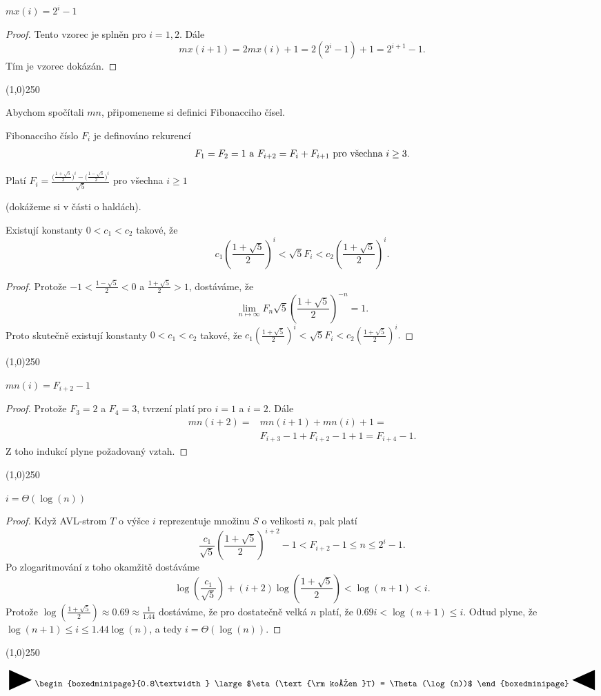 \documentclass[a4paper,12pt]{article}
\newenvironment{myproof}{
  \begin{proof}
    
  }{
  \end{proof}
  \begin{center}
   \line(1,0){250}
   \end{center}
  }
\newcommand{\zapamatovat}[1]{
 {
 
 \setlength\fboxrule{5pt}
 \begin{center}
 $\vcenter{
 \hbox{\raisebox{-0.8ex}{\scalebox{1.7}{\Huge\RIGHTarrow}}\begin{boxedminipage}{0.8\textwidth}
\large #1
 \end{boxedminipage}\raisebox{-0.8ex}{\scalebox{1.7}{\Huge\LEFTarrow}}}}$
 \end{center}
 }
 }
\begin{document}
\begin{lemma}[1]
    $mx(i)=2^i-1$
\end{lemma}


\begin{myproof}
    Tento vzorec je 
splněn pro $i=1,2$. Dále 
$$mx(i+1)=2mx(i)+1=2(2^i-1)+1=2^{i+1}-1.$$
Tím je vzorec dokázán. 
\end{myproof}

Abychom spočítali $mn$, připomeneme si definici Fibonacciho čísel. 

\begin{definice}Fibonacciho
číslo $F_i$ je definováno rekurencí
$$F_1=F_2=1\text{\rm\ a }F_{i+2}=F_i+F_{i+1}\text{\rm\ pro všechna }
i\ge 3.$$
\end{definice}
\begin{lemma}
Platí  $F_i=\frac {\big(\frac {1+\sqrt 5}2\big)^i-\big
(\frac {1-\sqrt 5}2\big)^i}{\sqrt 5}$ pro všechna $i\ge 1$ 
\end{lemma}
(dokážeme si v části o haldách). 

\begin{lemma}
    Existují konstanty $0<c_1<c_2$ takové, že 
    $$c_1(\frac {1+\sqrt 5}2)^i<\sqrt 5F_i<c_2(\frac {1+\sqrt 5}2)^i.$$
\end{lemma}
\begin{myproof}
Protože 
$-1<\frac {1-\sqrt 5}2<0$ a $\frac {1+\sqrt 5}2>1$, dostáváme, že 
$$\lim_{n\mapsto\infty}F_n\sqrt 5(\frac {1+\sqrt 5}2)^{-n}=1.$$
Proto skutečně existují konstanty $0<c_1<c_2$ takové, že 
$c_1(\frac {1+\sqrt 5}2)^i<\sqrt 5F_i<c_2(\frac {1+\sqrt 5}2)^i.$
\end{myproof}

\begin{lemma}[2]
     $mn(i)=F_{i+2}-1$
\end{lemma}

\begin{myproof}Protože $F_3
=2$ a 
$F_4=3$, 
tvrzení platí pro $i=1$ a $i=2$. Dále 
\begin{align*} mn(i+2)=&mn(i+1)+mn(i)+1=\\&F_{i+3}-1+F_{i+2}-1+1=F_{i+4}-1.\end{align*}
Z toho indukcí plyne požadovaný vztah. 
\end{myproof}
\begin{veta}
$i=\Theta (\log(n))$
\end{veta}
\begin{myproof}
Když AVL-strom $T$ o výšce $i$ reprezentuje množinu $
S$ o 
velikosti $n$, pak platí 
$$\frac {c_1}{\sqrt 5}(\frac {1+\sqrt 5}2)^{i+2}-1<F_{i+2}-1\le n
\le 2^i-1.$$
Po zlogaritmování z toho okamžitě dostáváme
$$\log(\frac {c_1}{\sqrt 5})+(i+2)\log(\frac {1+\sqrt 5}2)<\log(n
+1)<i.$$
Protože $\log(\frac {1+\sqrt 5}2)\approx 0.69\approx\frac 1{1.
44}$ dostáváme, že pro dostatečně velká $n$ 
platí, že $0.69i<\log(n+1)\le i$. Odtud plyne, že 
$\log(n+1)\le i\le 1.44\log(n)$, a tedy $i=\Theta (\log(n))$.
\end{myproof}
\zapamatovat{
$\eta (\text{\rm kořen }T) = \Theta (\log(n))$
}
\end{document}
